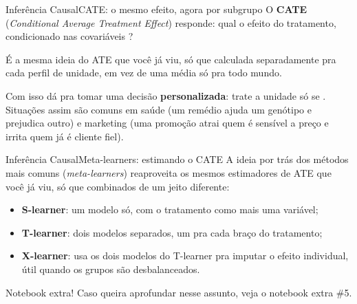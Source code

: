 \begin{frame}{Inferência Causal}{CATE: o mesmo efeito, agora por subgrupo}
    O \textbf{CATE} (\textit{Conditional Average Treatment Effect}) responde: qual o efeito do tratamento, condicionado nas covariáveis ?

    \vspace{10pt}
    \centering {}
    \raggedright

    \pause
    \vspace{15pt}
    É a mesma ideia do ATE que você já viu, só que calculada separadamente pra cada perfil de unidade, em vez de uma média só pra todo mundo.

    \pause
    \vfill
    Com isso dá pra tomar uma decisão \textbf{personalizada}: trate a unidade  só se . Situações assim são comuns em saúde (um remédio ajuda um genótipo e prejudica outro) e marketing (uma promoção atrai quem é sensível a preço e irrita quem já é cliente fiel).
\end{frame}

\begin{frame}{Inferência Causal}{Meta-learners: estimando o CATE}
    A ideia por trás dos métodos mais comuns (\textit{meta-learners}) reaproveita os mesmos estimadores de ATE que você já viu, só que combinados de um jeito diferente:
    \begin{itemize}
        \item \textbf{S-learner}: um modelo só, com o tratamento como mais uma variável;
        \pause
        \item \textbf{T-learner}: dois modelos separados, um pra cada braço do tratamento;
        \pause
        \item \textbf{X-learner}: usa os dois modelos do T-learner pra imputar o efeito individual, útil quando os grupos são desbalanceados.
    \end{itemize}

    \begin{alertblock}{Notebook extra!}
		Caso queira aprofundar nesse assunto, veja o notebook extra \#5.
	\end{alertblock}
\end{frame}
